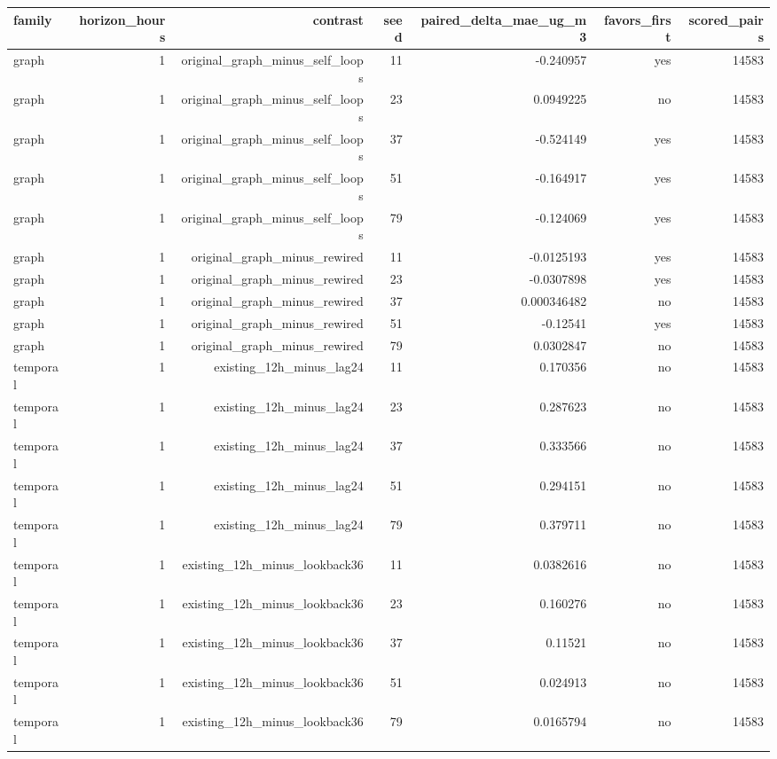 \begin{tabular}{lrrrrrr}
\hline
family & horizon\_hours & contrast & seed & paired\_delta\_mae\_ug\_m3 & favors\_first & scored\_pairs \\
\hline
graph & 1 & original\_graph\_minus\_self\_loops & 11 & -0.240957 & yes & 14583 \\
graph & 1 & original\_graph\_minus\_self\_loops & 23 & 0.0949225 & no & 14583 \\
graph & 1 & original\_graph\_minus\_self\_loops & 37 & -0.524149 & yes & 14583 \\
graph & 1 & original\_graph\_minus\_self\_loops & 51 & -0.164917 & yes & 14583 \\
graph & 1 & original\_graph\_minus\_self\_loops & 79 & -0.124069 & yes & 14583 \\
graph & 1 & original\_graph\_minus\_rewired & 11 & -0.0125193 & yes & 14583 \\
graph & 1 & original\_graph\_minus\_rewired & 23 & -0.0307898 & yes & 14583 \\
graph & 1 & original\_graph\_minus\_rewired & 37 & 0.000346482 & no & 14583 \\
graph & 1 & original\_graph\_minus\_rewired & 51 & -0.12541 & yes & 14583 \\
graph & 1 & original\_graph\_minus\_rewired & 79 & 0.0302847 & no & 14583 \\
temporal & 1 & existing\_12h\_minus\_lag24 & 11 & 0.170356 & no & 14583 \\
temporal & 1 & existing\_12h\_minus\_lag24 & 23 & 0.287623 & no & 14583 \\
temporal & 1 & existing\_12h\_minus\_lag24 & 37 & 0.333566 & no & 14583 \\
temporal & 1 & existing\_12h\_minus\_lag24 & 51 & 0.294151 & no & 14583 \\
temporal & 1 & existing\_12h\_minus\_lag24 & 79 & 0.379711 & no & 14583 \\
temporal & 1 & existing\_12h\_minus\_lookback36 & 11 & 0.0382616 & no & 14583 \\
temporal & 1 & existing\_12h\_minus\_lookback36 & 23 & 0.160276 & no & 14583 \\
temporal & 1 & existing\_12h\_minus\_lookback36 & 37 & 0.11521 & no & 14583 \\
temporal & 1 & existing\_12h\_minus\_lookback36 & 51 & 0.024913 & no & 14583 \\
temporal & 1 & existing\_12h\_minus\_lookback36 & 79 & 0.0165794 & no & 14583 \\

\end{tabular}
